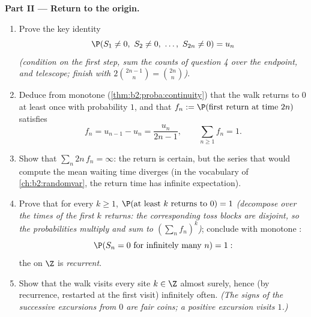 \begin{problem}
\medskip
\noindent\textbf{Part II --- Return to the origin.}
\begin{enumerate}[resume]
  \item Prove the key identity
        \[
        \P(S_1 \neq 0,\ S_2 \neq 0,\ \dots,\ S_{2n} \neq 0) =
        u_n
        \]
        \emph{(condition on the first step, sum the counts of
        question 4 over the endpoint, and telescope; finish
        with $2\binom{2n-1}{n} = \binom{2n}{n}$)}.
  \item Deduce from monotone 
        (\cref{thm:b2:proba:continuity}) that the walk
        returns to $0$ at least once with probability $1$,
        and that $f_n := \P(\text{first return at time }2n)$
        satisfies
        \[
        f_n = u_{n-1} - u_n = \frac{u_n}{2n-1},
        \qquad \sum_{n\geq1}f_n = 1 .
        \]
  \item Show that $\sum_n 2n\,f_n = \infty$: the return is
        certain, but the series that would compute the mean
        waiting time diverges (in the vocabulary of
        \cref{ch:b2:randomvar}, the return time has infinite
        expectation).
  \item Prove that for every $k \geq 1$, $\P(\text{at least }
        k\text{ returns to }0) = 1$ \emph{(decompose over the
        times of the first $k$ returns: the corresponding
        toss blocks are disjoint, so the probabilities
        multiply and sum to $(\sum_nf_n)^k$)}; conclude with
        monotone :
        \[
        \P(S_n = 0 \text{ for infinitely many } n) = 1 :
        \]
        the  on $\Z$ is \emph{recurrent}.
  \item Show that the walk visits every site $k \in \Z$
        almost surely, hence (by recurrence, restarted at the
        first visit) infinitely often. \emph{(The signs of
        the successive excursions from $0$ are 
        fair coins; a positive excursion visits $1$.)}
\end{enumerate}


\end{problem}
